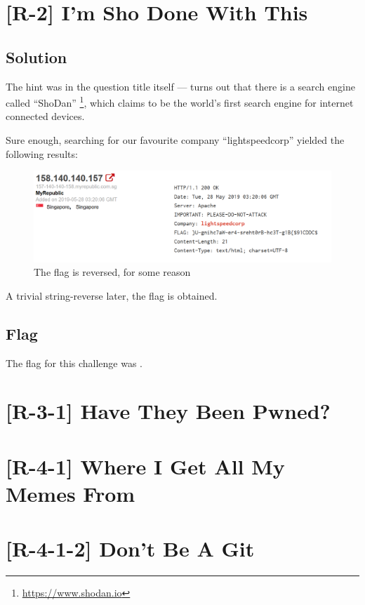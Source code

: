 

\pagebreak
\section{[R-2] I'm Sho Done With This}

	\subsection{Solution}

		The hint was in the question title itself --- turns out that there is a search engine called \enquote{ShoDan}
		\footnote{\url{https://www.shodan.io}}, which claims to be the world's first search engine for internet connected devices.

		Sure enough, searching for our favourite company \enquote{lightspeedcorp} yielded the following results:

		\begin{figure}[!htbp]\centering
			\includegraphics[width=150mm]{figures/osintred/r2.png} \vspace{5mm}
			\caption{The flag is reversed, for some reason}
		\end{figure}

		A trivial string-reverse later, the flag is obtained.


	\subsection{Flag}
		The flag for this challenge was .




\pagebreak
\section{[R-3-1] Have They Been Pwned?}




\pagebreak
\section{[R-4-1] Where I Get All My Memes From}



\pagebreak
\section{[R-4-1-2] Don't Be A Git}


























